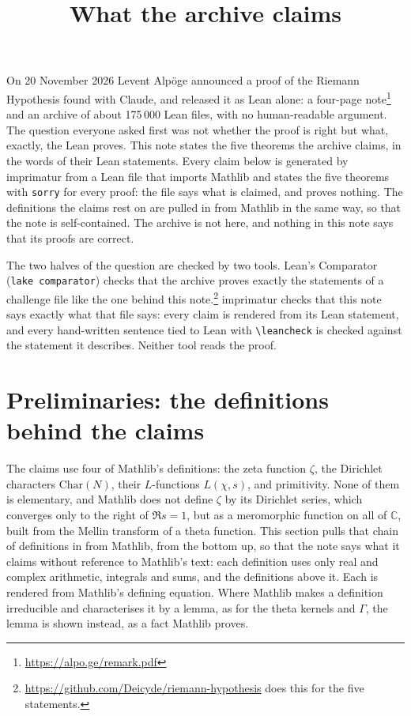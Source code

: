 \documentclass{article}
\title{What the archive claims}
\author{}
\date{}
\begin{document}
\maketitle

On 20 November 2026 Levent Alp\"oge announced a proof of the Riemann
Hypothesis found with Claude, and released it as Lean alone: a four-page
note\footnote{\url{https://alpo.ge/remark.pdf}} and an archive of about
175\,000 Lean files, with no human-readable argument. The question everyone
asked first was not whether the proof is right but what, exactly, the Lean
proves. This note states the five theorems the archive claims, in the words
of their Lean statements. Every claim below is generated by imprimatur from a
Lean file that imports Mathlib and states the five theorems with
\texttt{sorry} for every proof: the file says what is claimed, and proves
nothing. The definitions the claims rest on are pulled in from Mathlib in
the same way, so that the note is self-contained. The archive is not here, and nothing in this note says that its
proofs are correct.

The two halves of the question are checked by two tools. Lean's Comparator
(\texttt{lake comparator}) checks that the archive proves exactly the
statements of a challenge file like the one behind this
note.\footnote{\url{https://github.com/Deicyde/riemann-hypothesis} does
this for the five statements.} imprimatur checks that this note says exactly
what that file says: every claim is rendered from its Lean statement, and
every hand-written sentence tied to Lean with \verb|\leancheck| is checked
against the statement it describes. Neither tool reads the proof.

\section{Preliminaries: the definitions behind the claims}

The claims use four of Mathlib's definitions: the zeta function $\zeta$, the
Dirichlet characters $\mathrm{Char}(N)$, their $L$-functions $L(\chi, s)$,
and primitivity. None of them is elementary, and Mathlib does not define
$\zeta$ by its Dirichlet series, which converges only to the right of
$\Re s = 1$, but as a meromorphic function on all of $\mathbb{C}$, built from
the Mellin transform of a theta function. This section pulls that chain of
definitions in from Mathlib, from the bottom up, so that the note says what
it claims without reference to Mathlib's text: each definition uses only
real and complex arithmetic, integrals and sums, and the definitions above
it. Each is rendered from Mathlib's defining equation. Where Mathlib makes a
definition irreducible and characterises it by a lemma, as for the theta
kernels and $\Gamma$, the lemma is shown instead, as a fact Mathlib proves.
\end{document}

